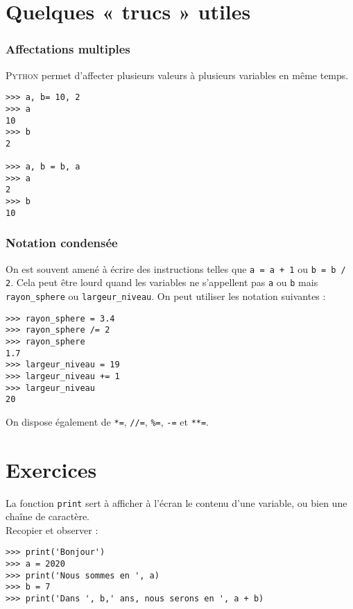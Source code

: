 \section{Quelques « trucs »  utiles}

\subsubsection*{Affectations multiples}
\textsc{Python} permet d'affecter plusieurs valeurs à plusieurs variables en même temps.

\begin{pyc}\begin{verbatim}
>>> a, b= 10, 2
>>> a
10
>>> b
2

>>> a, b = b, a
>>> a
2
>>> b
10
\end{verbatim}
\end{pyc}

\subsubsection*{Notation condensée}
On est souvent amené à écrire des instructions telles que  \texttt{a = a + 1} ou \texttt{b = b / 2}. Cela peut être lourd quand les variables ne s'appellent
pas \texttt{a} ou \texttt{b} mais \texttt{rayon_sphere} ou \texttt{largeur_niveau}. On peut utiliser les notation suivantes :
\begin{pyc}\begin{verbatim}
>>> rayon_sphere = 3.4
>>> rayon_sphere /= 2
>>> rayon_sphere
1.7
>>> largeur_niveau = 19
>>> largeur_niveau += 1
>>> largeur_niveau
20
\end{verbatim}
\end{pyc}

On dispose également de \texttt{*=}, \texttt{//=}, \texttt{\%=}, \texttt{-=} et \texttt{**=}.
\section{Exercices}

\begin{exercice}

    La fonction \texttt{print} sert à afficher à l'écran le contenu d'une variable, ou bien une chaîne de caractère.\\
    Recopier et observer :
\begin{verbatim}
>>> print('Bonjour')
>>> a = 2020
>>> print('Nous sommes en ', a)
>>> b = 7
>>> print('Dans ', b,' ans, nous serons en ', a + b)
\end{verbatim}
\end{exercice}


